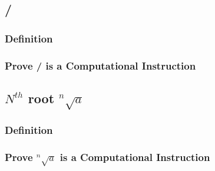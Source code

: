 \documentclass[11pt]{article}
\begin{document}
\subsection{/}
\subsubsection{Definition}
\subsubsection{Prove / is a Computational Instruction}







\subsection{$N^{th}$ root $^n \sqrt{a}$}
\subsubsection{Definition}
\subsubsection{Prove $^n \sqrt{a}$  is a Computational Instruction}








\end{document}
